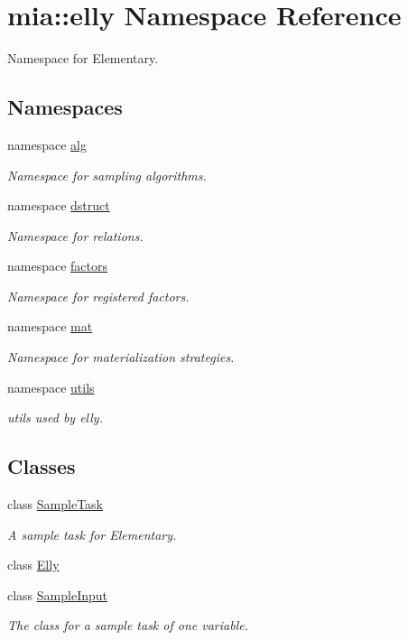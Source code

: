 \hypertarget{namespacemia_1_1elly}{\section{mia\-:\-:elly Namespace Reference}
\label{namespacemia_1_1elly}
}


Namespace for Elementary.  


\subsection*{Namespaces}
\begin{DoxyCompactItemize}
\item 
namespace \hyperlink{namespacemia_1_1elly_1_1alg}{alg}
\begin{DoxyCompactList}\small\item\em Namespace for sampling algorithms. \end{DoxyCompactList}\item 
namespace \hyperlink{namespacemia_1_1elly_1_1dstruct}{dstruct}
\begin{DoxyCompactList}\small\item\em Namespace for relations. \end{DoxyCompactList}\item 
namespace \hyperlink{namespacemia_1_1elly_1_1factors}{factors}
\begin{DoxyCompactList}\small\item\em Namespace for registered factors. \end{DoxyCompactList}\item 
namespace \hyperlink{namespacemia_1_1elly_1_1mat}{mat}
\begin{DoxyCompactList}\small\item\em Namespace for materialization strategies. \end{DoxyCompactList}\item 
namespace \hyperlink{namespacemia_1_1elly_1_1utils}{utils}
\begin{DoxyCompactList}\small\item\em utils used by elly. \end{DoxyCompactList}\end{DoxyCompactItemize}
\subsection*{Classes}
\begin{DoxyCompactItemize}
\item 
class \hyperlink{classmia_1_1elly_1_1_sample_task}{Sample\-Task}
\begin{DoxyCompactList}\small\item\em A sample task for Elementary. \end{DoxyCompactList}\item 
class \hyperlink{classmia_1_1elly_1_1_elly}{Elly}
\item 
class \hyperlink{classmia_1_1elly_1_1_sample_input}{Sample\-Input}
\begin{DoxyCompactList}\small\item\em The class for a sample task of one variable. \end{DoxyCompactList}\end{DoxyCompactItemize}
